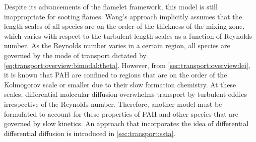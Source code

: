 Despite its advancements of the flamelet framework, this model is still inappropriate for sooting flames. Wang's approach implicitly assumes that the length scales of all species are on the order of the thickness of the mixing zone, which varies with respect to the turbulent length scales as a function of Reynolds number. As the Reynolds number varies in a certain region, all species are governed by the mode of transport dictated by \cref{eq:transport:overview:bimodal:theta}. However, from \cref{sec:transport:overview:lei}, it is known that PAH are confined to regions that are on the order of the Kolmogorov scale or smaller due to their slow formation chemistry. At these scales, differential molecular diffusion overwhelms transport by turbulent eddies irrespective of the Reynolds number. Therefore, another model must be formulated to account for these properties of PAH and other species that are governed by slow kinetics. An approach that incorporates the idea of differential differential diffusion is introduced in \cref{sec:transport:ssta}.
